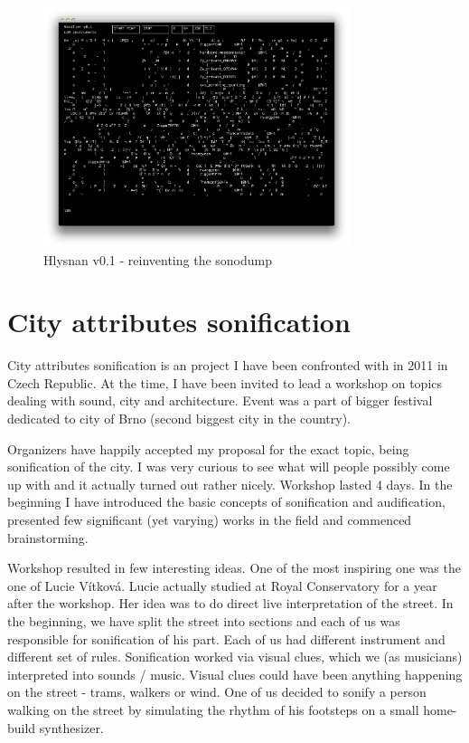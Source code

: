 \documentclass[12pt,a4paper,oneside]{report}
\begin{document}
\begin{figure}  
  \centering
    \includegraphics[width=0.8\textwidth]{img/hlysnan}%
	\caption{Hlysnan v0.1 - reinventing the sonodump}
	\label{fig:hlysnan}
\end{figure}

\clearpage

\section{City attributes sonification}

City attributes sonification is an project I have been confronted with in 2011 in Czech Republic. At the time, I have been invited to lead a workshop on topics dealing with sound, city and architecture. Event was a part of bigger festival dedicated to city of Brno (second biggest city in the country).

Organizers have happily accepted my proposal for the exact topic, being sonification of the city. I was very curious to see what will people possibly come up with and it actually turned out rather nicely. Workshop lasted 4 days. In the beginning I have introduced the basic concepts of sonification and audification, presented few significant (yet varying) works in the field and commenced brainstorming.

Workshop resulted in few interesting ideas. One of the most inspiring one was the one of Lucie Vítková. Lucie actually studied at Royal Conservatory for a year after the workshop. Her idea was to do direct live interpretation of the street.  In the beginning, we have split the street into sections and each of us was responsible for sonification of his part. Each of us had different instrument and different set of rules. Sonification worked via visual clues, which we (as musicians) interpreted into sounds / music. Visual clues could have been anything happening on the street - trams, walkers or wind. One of us decided to sonify a person walking on the street by simulating the rhythm of his footsteps on a small home-build synthesizer.
\end{document}
